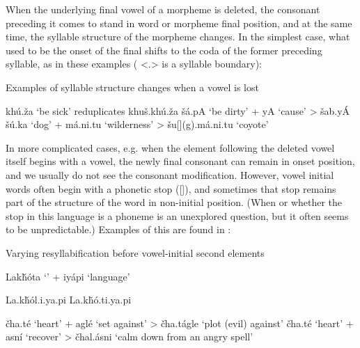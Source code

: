 \documentclass[output=paper]{LSP/langsci}
\begin{document}
When the underlying final vowel of a morpheme is deleted, the consonant preceding it comes to stand in word or morpheme final position, and at the same time, the syllable structure of the morpheme changes. In the simplest case, what used to be the onset of the final shifts to the coda of the former preceding syllable, as in these examples ( <.> is a syllable boundary):

\begin{exe}
\ex\label{ex:rood:12} Examples of syllable structure changes when a vowel is lost
\begin{xlist}
\ex khú.\v{z}a `be sick' reduplicates khu\v{s}.khú.\v{z}a
\ex \v{s}á.pA `be dirty' + yA `cause' > \v{s}ab.yÁ
\ex \v{s}ú.ka `dog' + má.ni.tu `wilderness' > \v{s}u[](g).má.ni.tu `coyote'
\end{xlist}
\end{exe}

In more complicated cases, e.g. when the element following the deleted vowel itself begins with a vowel, the newly final consonant can remain in onset position, and we usually do not see the consonant modification. However, vowel initial words often begin with a phonetic  stop ([]), and sometimes that  stop remains part of the structure of the word in non-initial position. (When or whether the  stop in this language is a phoneme is an unexplored question, but it often seems to be unpredictable.) Examples of this are found in :

\begin{exe}
\ex \label{ex:rood:13}Varying resyllabification before vowel-initial second elements
\begin{xlist}
\ex Lak\v{h}\'ota `' + iyápi `language'
\begin{xlist}
\ex La.k\v{h}\'ol.i.ya.pi
\ex La.k\v{h}\'o.ti.ya.pi
\end{xlist}
\ex 
\begin{xlist}
\ex \v{c}ha.té `heart' + aglé `set against' > \v{c}ha.tágle `plot (evil) against'
\ex \v{c}ha.té `heart' + asní `recover' > \v{c}hal.ásni `calm down from an angry spell'
\end{xlist}
\end{xlist}
\end{exe}
\end{document}
